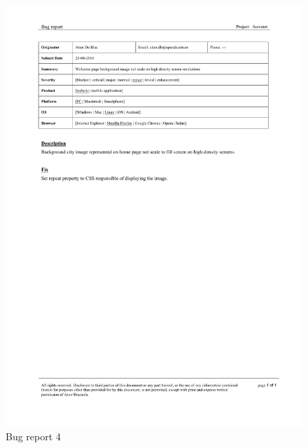 \documentclass{DeustoFDP}
\begin{document}
\begin{figure}[h!]
	\centering
	\includegraphics[width=1\linewidth]{fig/Bugs/b4}
	\caption[Bug report]{Bug report 4}
	\label{fig:b4}
\end{figure}
\end{document}
